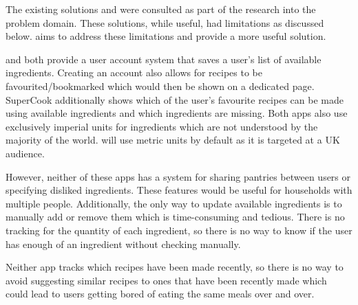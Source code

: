 \documentclass[../CHEFCookingHelperForEveryonesFridge.tex]{subfiles}
\renewcommand{\cite}[1]{\parencite{#1}}
\begin{document}

The existing solutions \cite{myfridgefood_myfridgefood_nodate} and \cite{supercook_supercook_nodate} were consulted
as part of the research into the problem domain. These solutions, while useful, had limitations as discussed below.
\chef{} aims to address these limitations and provide a more useful solution.

\cite{myfridgefood_myfridgefood_nodate} and \cite{supercook_supercook_nodate} both provide a user account system
that saves a user's list of available ingredients. Creating an account also allows for recipes to be favourited/bookmarked
which would then be shown on a dedicated page. SuperCook additionally shows which of the user's favourite recipes
can be made using available ingredients and which ingredients are missing. Both apps also use exclusively imperial
units for ingredients which are not understood by the majority of the world. \chef{} will use metric units by default
as it is targeted at a UK audience.

However, neither of these apps has a system for sharing pantries between users or specifying disliked ingredients. These features would be useful for households with multiple people.
Additionally, the only way to update available ingredients is to manually add or remove them which is time-consuming and tedious. There is no tracking for the quantity of
each ingredient, so there is no way to know if the user has enough of an ingredient without checking manually.

Neither app tracks which recipes have been made recently, so there is no way to avoid suggesting similar recipes to ones that have been recently made which could lead to
users getting bored of eating the same meals over and over.
\end{document}
